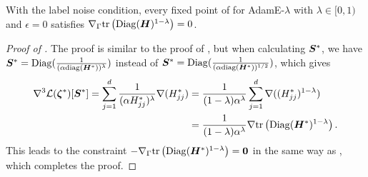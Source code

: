 \begin{lemma}[AdamE's Implicit Bias under Label Noise and $\epsilon = 0$]
    With the label noise condition, every fixed point of  for AdamE-$\lambda$ with $\lambda \in [0, 1)$ and $\epsilon = 0$ satisfies $\nabla_{\Gamma} \text{tr}\left(\mathrm{Diag}({\bm{H}})^{1-\lambda}\right) = 0$.
    \label{thm:formal-adamE-implicit-bias-label-noise-eps-0}
\end{lemma}
\begin{proof}[Proof of ]
    The proof is similar to the proof of , but when calculating ${\bm{S}}^*$, we have ${\bm{S}}^* = \mathrm{Diag}(\frac{1}{(\alpha\mathrm{diag}({\bm{H}}^*))^{\lambda}})$ instead of ${\bm{S}}^* = \mathrm{Diag}(\frac{1}{(\alpha\mathrm{diag}({\bm{H}}^*))^{1/2}})$, which gives
    \begin{align*}
        \nabla^3 \mathcal{L} ({\bm{\zeta}}^*)[{\bm{S}}^*] = \sum_{j=1}^{d} \frac{1}{(\alpha H^*_{jj})^{\lambda}} \nabla(H^*_{jj}) &= \frac{1}{(1-\lambda)\alpha^{\lambda}} \sum_{j=1}^{d} \nabla ((H^*_{jj})^{1-\lambda}) \\
        &= \frac{1}{(1-\lambda)\alpha^{\lambda}} \nabla \text{tr}\left(\mathrm{Diag}({\bm{H}}^*)^{1-\lambda}\right).
    \end{align*}
    This leads to the constraint 
    $-\nabla_{\Gamma}\text{tr}\left(\mathrm{Diag}({\bm{H}}^*)^{1-\lambda}\right) = {\bm{0}}$ in the same way as , which completes the proof.
\end{proof}


